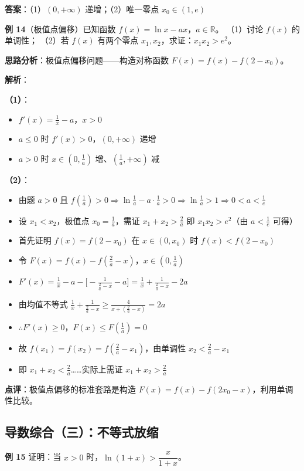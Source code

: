 \textbf{答案}：（1）$(0,+\infty)$ 递增；（2）唯一零点 $x_0\in(1,e)$

\textbf{例 14}（极值点偏移）已知函数 $f(x)=\ln x - ax$，$a\in\mathbb{R}$。
（1）讨论 $f(x)$ 的单调性；
（2）若 $f(x)$ 有两个零点 $x_1,x_2$，求证：$x_1x_2 > e^2$。

\textbf{思路分析}：极值点偏移问题——构造对称函数 $F(x)=f(x)-f(2-x_0)$。

\textbf{解析}：

\textbf{（1）}：
\begin{itemize}
  \item $f'(x)=\frac1x-a$，$x>0$
  \item $a\le0$ 时 $f'(x)>0$，$(0,+\infty)$ 递增
  \item $a>0$ 时 $x\in(0,\frac1a)$ 增、$(\frac1a,+\infty)$ 减
\end{itemize}

\textbf{（2）}：
\begin{itemize}
  \item 由题 $a>0$ 且 $f(\frac1a)>0 \Rightarrow \ln\frac1a - a\cdot\frac1a >0 \Rightarrow \ln\frac1a >1 \Rightarrow 0<a<\frac1e$
  \item 设 $x_1<x_2$，极值点 $x_0=\frac1a$，需证 $x_1+x_2 > \frac2a$ 即 $x_1x_2 > e^2$（由 $a<\frac1e$ 可得）
  \item 首先证明 $f(x)=f(2-x_0)$ 在 $x\in(0,x_0)$ 时 $f(x)<f(2-x_0)$
  \item 令 $F(x)=f(x)-f(\frac2a-x)$，$x\in(0,\frac1a)$
  \item $F'(x)=\frac1x-a-\big[-\frac1{\frac2a-x}-a\big]=\frac1x+\frac1{\frac2a-x}-2a$
  \item 由均值不等式 $\frac1x+\frac1{\frac2a-x} \ge \frac4{x+(\frac2a-x)}=2a$
  \item $\therefore F'(x)\ge0$，$F(x)\le F(\frac1a)=0$
  \item 故 $f(x_1)=f(x_2)=f(\frac2a-x_1)$，由单调性 $x_2<\frac2a-x_1$
  \item 即 $x_1+x_2<\frac2a$……实际上需证 $x_1+x_2>\frac2a$
\end{itemize}

\textbf{点评}：极值点偏移的标准套路是构造 $F(x)=f(x)-f(2x_0-x)$，利用单调性比较。

\subsection{导数综合（三）：不等式放缩}

\textbf{例 15} 证明：当 $x>0$ 时，$\ln(1+x) > \dfrac{x}{1+x}$。


